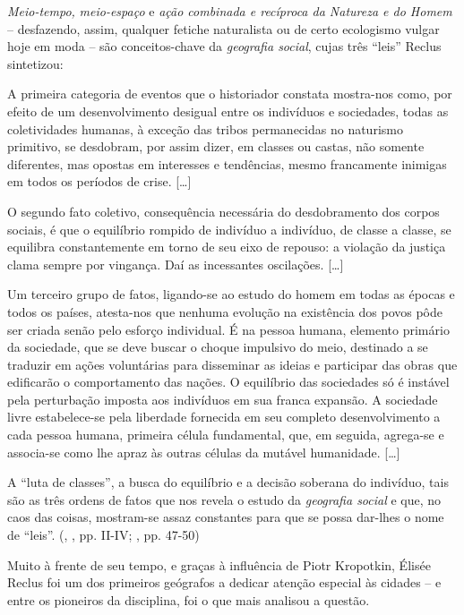 \textit{Meio-tempo,} \textit{meio-espaço }e \textit{ação combinada e recíproca da Natureza e do Homem} -- desfazendo, assim, qualquer fetiche naturalista ou de certo ecologismo vulgar hoje em moda -- são conceitos-chave da \textit{geografia social}, cujas três ``leis'' Reclus sintetizou:

\begin{citacao}
A primeira categoria de eventos que o historiador constata mostra-nos como, por efeito de um desenvolvimento desigual entre os indivíduos e sociedades, todas as coletividades humanas, à exceção das tribos permanecidas no naturismo primitivo, se desdobram, por assim dizer, em classes ou castas, não somente diferentes, mas opostas em interesses e tendências, mesmo francamente inimigas em todos os períodos de crise. [{\dots}]

O segundo fato coletivo, consequência necessária do desdobramento dos corpos sociais, é que o equilíbrio rompido de indivíduo a indivíduo, de classe a classe, se equilibra constantemente em torno de seu eixo de repouso: a violação da justiça clama sempre por vingança. Daí as incessantes oscilações. [{\dots}]

Um terceiro grupo de fatos, ligando-se ao estudo do homem em todas as épocas e todos os países, atesta-nos que nenhuma evolução na existência dos povos pôde ser criada senão pelo esforço individual. É na pessoa humana, elemento primário da sociedade, que se deve buscar o choque impulsivo do meio, destinado a se traduzir em ações voluntárias para disseminar as ideias e participar das obras que edificarão o comportamento das nações. O equilíbrio das sociedades só é instável pela perturbação imposta aos indivíduos em sua franca expansão. A sociedade livre estabelece-se pela liberdade fornecida em seu completo desenvolvimento a cada pessoa humana, primeira célula fundamental, que, em seguida, agrega-se e associa-se como lhe apraz às outras células da mutável humanidade. [{\dots}]

A ``luta de classes'', a busca do equilíbrio e a decisão soberana do indivíduo, tais são as três ordens de fatos que nos revela o estudo da \textit{geografia social }e que, no caos das coisas, mostram-se assaz constantes para que se possa dar-lhes o nome de ``leis''. (\citeauthor{RECLUS1905a}, \citeyear{RECLUS1905a}, pp. II-IV; \citeyear{reclus_renovacao_2010}, pp. 47-50)
\end{citacao}

Muito à frente de seu tempo, e graças à influência de Piotr Kropotkin, Élisée Reclus foi um dos primeiros geógrafos a dedicar atenção especial às cidades -- e entre os pioneiros da disciplina, foi o que mais analisou a questão.

